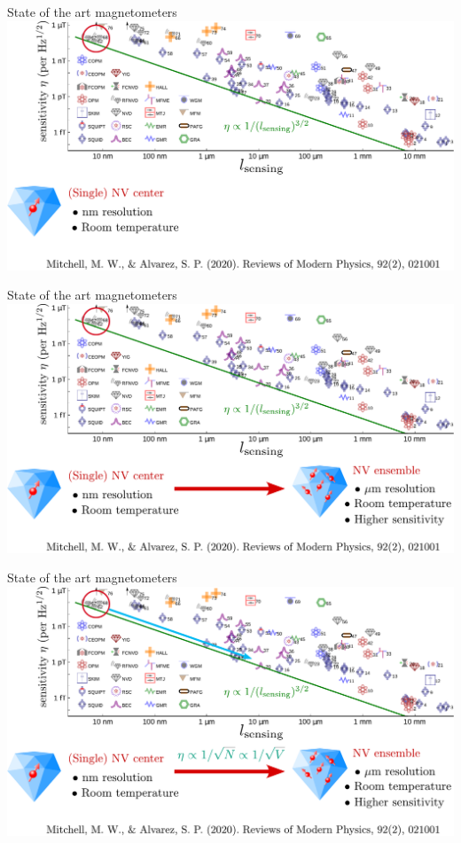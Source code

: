\documentclass{beamer}
\begin{document}
\begin{frame}{State of the art magnetometers}
\centering
\includegraphics[width=\textwidth,height=0.85\textheight,keepaspectratio]{Slide_quantum_magnetometers_NV_n-3}
\end{frame}

\begin{frame}{State of the art magnetometers}
\centering
\includegraphics[width=\textwidth,height=0.85\textheight,keepaspectratio]{Slide_quantum_magnetometers_NV_n-2}
\end{frame}

\begin{frame}{State of the art magnetometers}
\centering
\includegraphics[width=\textwidth,height=0.85\textheight,keepaspectratio]{Slide_quantum_magnetometers_NV_n-1}
\end{frame}
\end{document}

